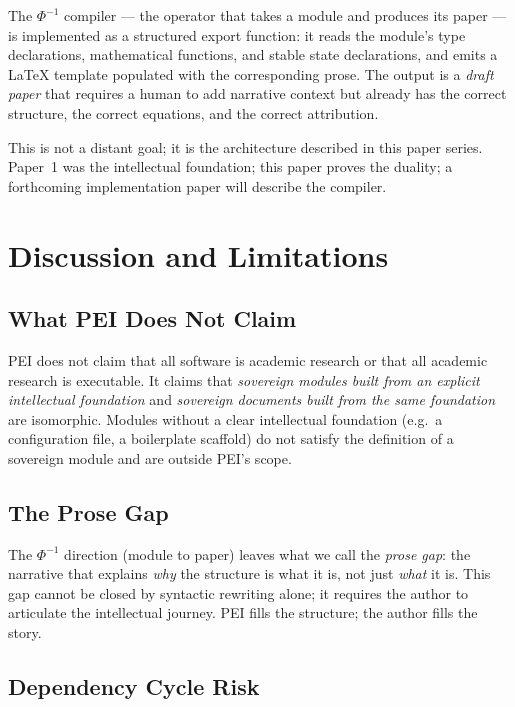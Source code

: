 \documentclass[12pt]{article}
\begin{document}
The $\Phi^{-1}$ compiler — the operator that takes a module and produces its
paper — is implemented as a structured export function: it reads the module's
type declarations, mathematical functions, and stable state declarations, and
emits a LaTeX template populated with the corresponding prose.  The output is
a \emph{draft paper} that requires a human to add narrative context but
already has the correct structure, the correct equations, and the correct
attribution.

This is not a distant goal; it is the architecture described in this paper
series.  Paper~1 was the intellectual foundation; this paper proves the
duality; a forthcoming implementation paper will describe the compiler.

\section{Discussion and Limitations}
\label{sec:discussion}

\subsection{What PEI Does Not Claim}

PEI does not claim that all software is academic research or that all academic
research is executable.  It claims that \emph{sovereign modules built from an
explicit intellectual foundation} and \emph{sovereign documents built from the
same foundation} are isomorphic.  Modules without a clear intellectual
foundation (e.g.\ a configuration file, a boilerplate scaffold) do not satisfy
the definition of a sovereign module and are outside PEI's scope.

\subsection{The Prose Gap}

The $\Phi^{-1}$ direction (module to paper) leaves what we call the
\emph{prose gap}: the narrative that explains \emph{why} the structure is what
it is, not just \emph{what} it is.  This gap cannot be closed by syntactic
rewriting alone; it requires the author to articulate the intellectual journey.
PEI fills the structure; the author fills the story.

\subsection{Dependency Cycle Risk}
\end{document}

